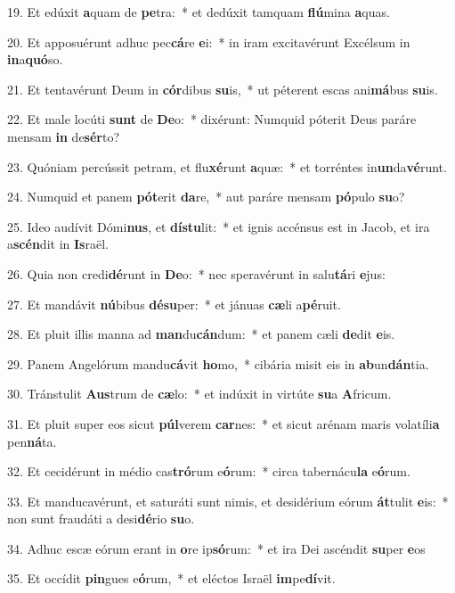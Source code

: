 19. Et edúxit \textbf{a}quam de \textbf{pe}tra:~*  et dedúxit tamquam \textbf{flú}mina \textbf{a}quas.\

20. Et apposuérunt adhuc pec\textbf{cá}re \textbf{e}i:~*  in iram excitavérunt Excélsum in \textbf{in}a\textbf{quó}so.\

21. Et tentavérunt Deum in \textbf{cór}dibus \textbf{su}is,~*  ut péterent escas ani\textbf{má}bus \textbf{su}is.\

22. Et male locúti \textbf{sunt} de \textbf{De}o:~*  dixérunt: Numquid póterit Deus paráre mensam \textbf{in} de\textbf{sér}to?\

23. Quóniam percússit petram, et flu\textbf{xé}runt \textbf{a}quæ:~*  et torréntes in\textbf{un}da\textbf{vé}runt.\

24. Numquid et panem \textbf{pót}erit \textbf{da}re,~*  aut paráre mensam \textbf{pó}pulo \textbf{su}o?\

25. Ideo audívit Dómi\textbf{nus}, et \textbf{dís}\textbf{tu}lit:~*  et ignis accénsus est in Jacob, et ira a\textbf{scén}dit in \textbf{Is}raël.\

26. Quia non credi\textbf{dé}runt in \textbf{De}o:~*  nec speravérunt in salu\textbf{tá}ri \textbf{e}jus:\

27. Et mandávit \textbf{nú}bibus \textbf{dé}\textbf{su}per:~*  et jánuas \textbf{cæ}li a\textbf{pé}ruit.\

28. Et pluit illis manna ad \textbf{man}du\textbf{cán}dum:~*  et panem cæli \textbf{de}dit \textbf{e}is.\

29. Panem Angelórum mandu\textbf{cá}vit \textbf{ho}mo,~*  cibária misit eis in \textbf{ab}un\textbf{dán}tia.\

30. Tránstulit \textbf{Aus}trum de \textbf{cæ}lo:~*  et indúxit in virtúte \textbf{su}a \textbf{A}fricum.\

31. Et pluit super eos sicut \textbf{púl}verem \textbf{car}nes:~*  et sicut arénam maris volatíli\textbf{a} pen\textbf{ná}ta.\

32. Et cecidérunt in médio cas\textbf{tró}rum e\textbf{ó}rum:~*  circa tabernácu\textbf{la} e\textbf{ó}rum.\

33. Et manducavérunt, et saturáti sunt nimis, et desidérium eórum \textbf{át}tulit \textbf{e}is:~*  non sunt fraudáti a desi\textbf{dé}rio \textbf{su}o.\

34. Adhuc escæ eórum erant in \textbf{o}re ip\textbf{só}rum:~*  et ira Dei ascéndit \textbf{su}per \textbf{e}os\

35. Et occídit \textbf{pin}gues e\textbf{ó}rum,~*  et eléctos Israël \textbf{im}pe\textbf{dí}vit.\

